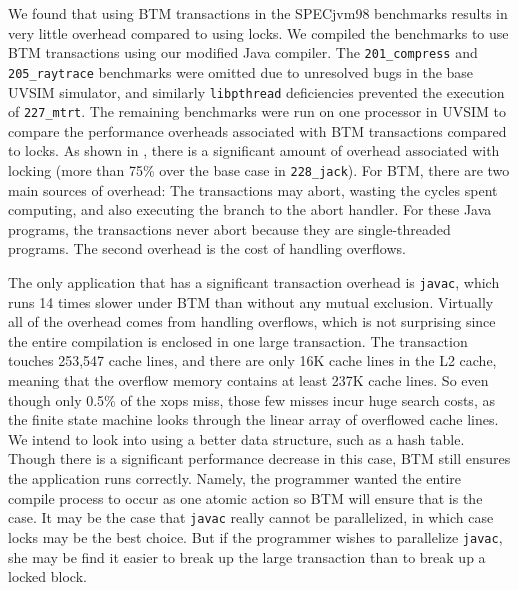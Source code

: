 \documentclass[preprint]{rdbacmconf}
\begin{document}
We found that using BTM transactions in the SPECjvm98 benchmarks
results in very little overhead compared to using locks. We compiled
the benchmarks to use BTM transactions using our modified Java
compiler.  The \texttt{201\_compress} and \texttt{205\_raytrace}
benchmarks were omitted due to unresolved bugs in the base UVSIM
simulator, and similarly \texttt{libpthread} deficiencies prevented
the execution of \texttt{227\_mtrt}.
The remaining benchmarks were run on one processor in UVSIM to compare the
performance overheads associated with BTM transactions compared to
locks.  As shown in , there is a significant amount
of overhead associated with locking (more than 75\% over the base case
in {\texttt{228\_jack})}. %
For BTM, there are two main sources of
overhead: The transactions may abort, wasting the cycles spent
computing, and also executing the branch to the abort handler.  For
these Java programs, the transactions never abort because they are
single-threaded programs.  The second overhead is the cost of handling
overflows.

The only application that has a significant transaction overhead is
\texttt{javac}, which runs 14 times slower under BTM than without any
mutual exclusion.  Virtually all of the overhead comes from handling
overflows, which is not surprising since the entire compilation is
enclosed in one large transaction.  The transaction touches 253,547
cache lines, and there are only 16K cache lines in the L2 cache,
meaning that the overflow memory contains at least 237K cache lines.
So even though only 0.5\% of the xops miss, those few misses incur
huge search costs, as the finite state machine looks through the
linear array of overflowed cache lines.  We intend to look into using
a better data structure, such as a hash table.  Though there is a
significant performance decrease in this case, BTM still ensures the
application runs correctly. Namely, the programmer wanted the entire
compile process to occur as one atomic action so BTM will ensure that
is the case.  It may be the case that \texttt{javac} really cannot be
parallelized, in which case locks may be the best choice.  But if the
programmer wishes to parallelize \texttt{javac}, she may be find it
easier to break up the large transaction than to break up a locked
block.

\end{document}
